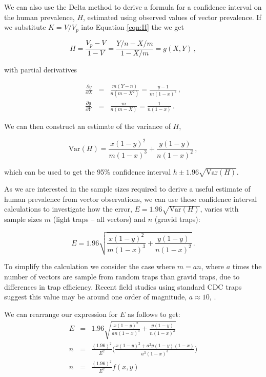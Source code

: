 We can also use the Delta method to derive a formula for a confidence interval on the human prevalence, $H$, estimated using observed values of vector prevalence. If we substitute $K=V/V_p$ into Equation \ref{eqn:H} the we get

\begin{equation}
    H = \frac{V_p-V}{1-V} = \frac{Y/n - X/m}{1-X/m} = g(X,Y)\,,
\end{equation}

with partial derivatives

\begin{eqnarray}
    \frac{\partial g}{\partial X} &=& \frac{m(Y-n)}{n(m-X^2)} = \frac{y-1}{m(1-x)^2}\,,\\
    \frac{\partial g}{\partial Y} &=& \frac{m}{n(m-X)} = \frac{1}{n(1-x)}\,.
\end{eqnarray}

We can then construct an estimate of the variance of $H$,

\begin{equation}
    \mbox{Var}(H) = \frac{x(1-y)^2}{m(1-x)^3} + \frac{y(1-y)}{n(1-x)^2}\,,
\end{equation}

which can be used to get the 95\% confidence interval $h\pm 1.96\sqrt{\mbox{Var}(H)}$. 

As we are interested in the sample sizes required to derive a useful estimate of human prevalence from vector observations, we can use these confidence interval calculations to investigate how the error, $E=1.96\sqrt{\mbox{Var}(H)}$, varies with sample sizes $m$ (light traps -- all vectors) and $n$ (gravid traps):

\begin{equation}
    E = 1.96\sqrt{\frac{x(1-y)^2}{m(1-x)^3} + \frac{y(1-y)}{n(1-x)^2}}\,.
\end{equation}

To simplify the calculation we consider the case where $m=an$, where $a$ times the number of vectors are sample from random traps than gravid traps, due to differences in trap efficiency. Recent field studies using standard CDC traps suggest this value may be around one order of magnitude, $a\approx10$, \cite{Zhang2013,Chen2011,Williams2007}.

We can rearrange our expression for $E$ as follows to get:
\begin{eqnarray}
    E &=& 1.96\sqrt{\frac{x(1-y)^2}{an(1-x)^3} + \frac{y(1-y)}{n(1-x)^2}} \\
    n &=& \frac{(1.96)^2}{E^2}\Bigg(\frac{x(1-y)^2+a^2y(1-y)(1-x)}{a^3(1-x)^3}\Bigg) \\
    n &=& \frac{(1.96)^2}{E^2}f(x,y)
    \label{eqn:m}
\end{eqnarray}

